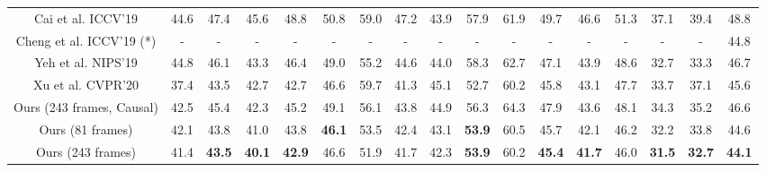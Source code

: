 \documentclass[journal]{IEEEtran}
\begin{document}
\begin{table*}[htbp]
\begin{threeparttable}
{\begin{tabular}{|c|c|c|c|c|c|c|c|c|c|c|c|c|c|c|c|c|}
    Cai et al. \cite{cai2019exploiting} ICCV'19 &44.6 &47.4 &45.6 &48.8 &50.8 &59.0 &47.2 &43.9 &57.9 &61.9 &49.7 &46.6 &51.3 &37.1 &39.4 &48.8\\
    Cheng et al. \cite{cheng2019occlusion} ICCV'19 (*) &- &- &- &- &- &- &- &- &- &- &- &- &- &- &- &44.8\\
    Yeh et al. \cite{yeh2019chirality} NIPS'19 &44.8 &46.1 &43.3 &46.4 &49.0 &55.2 &44.6 &44.0 &58.3 &62.7 &47.1 &43.9 &48.6 &32.7 &33.3 &46.7\\
    Xu et al. \cite{xu2020deep} CVPR'20 &37.4 &43.5 &42.7 &42.7 &46.6 &59.7 &41.3 &45.1 &52.7 &60.2 &45.8 &43.1 &47.7 &33.7 &37.1 &45.6 \\
    \cline{1-17}
    Ours (243 frames, Causal) &42.5&45.4&42.3&45.2&49.1&56.1&43.8&44.9&56.3&64.3&47.9&43.6&48.1&34.3&35.2&46.6\\
    Ours (81 frames) &42.1 &43.8 &41.0 &43.8 &\textbf{46.1} &53.5 &42.4 &43.1 &\textbf{53.9} &60.5 &45.7 &42.1 &46.2 &32.2 &33.8 &44.6 \\
    Ours (243 frames) &41.4 &\textbf{43.5} &\textbf{40.1} &\textbf{42.9} &46.6 &51.9 &41.7 &42.3 &\textbf{53.9} &60.2 &\textbf{45.4} &\textbf{41.7} &46.0 &\textbf{31.5} &\textbf{32.7} &\textbf{44.1} \\ \cline{1-17}
    

\end{tabular}}
\end{threeparttable}
\end{table*}
\end{document}
